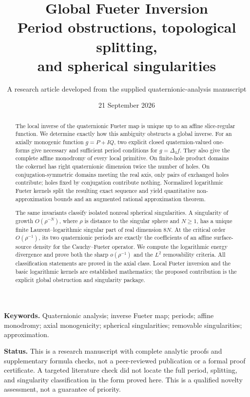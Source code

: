 \documentclass[11pt,a4paper]{article}
\title{\vspace{-10mm}\textbf{Global Fueter Inversion}\\[4pt]
\large Period obstructions, topological splitting,\\and spherical singularities}
\author{A research article developed from the supplied quaternionic-analysis manuscript}
\date{21 September 2026}
\numberwithin{equation}{section}
\theoremstyle{definition}
\theoremstyle{remark}
\begin{document}
\maketitle
\thispagestyle{empty}
\begin{abstract}
The local inverse of the quaternionic Fueter map is unique up to an affine
slice-regular function. We determine exactly how this ambiguity obstructs a
global inverse. For an axially monogenic function $g=P+IQ$, two explicit closed
quaternion-valued one-forms give necessary and sufficient period conditions for
$g=\Delta_4 f$. They also give the complete affine monodromy of every local
primitive. On finite-hole product domains the cokernel has right quaternionic
dimension twice the number of holes. On conjugation-symmetric domains meeting
the real axis, only pairs of exchanged holes contribute; holes fixed by
conjugation contribute nothing. Normalized logarithmic Fueter kernels split the
resulting exact sequence and yield quantitative non-approximation bounds and an
augmented rational approximation theorem.

The same invariants classify isolated nonreal spherical singularities. A
singularity of growth $O(\rho^{-N})$, where $\rho$ is distance to the singular
sphere and $N\geq1$, has a unique finite Laurent--logarithmic singular part of
real dimension $8N$. At the critical order $O(\rho^{-1})$, its two quaternionic
periods are exactly the coefficients of an affine surface-source density for
the Cauchy--Fueter operator. We compute the logarithmic energy divergence and
prove both the sharp $o(\rho^{-1})$ and the $L^2$ removability criteria. All
classification statements are proved in the axial class. Local Fueter inversion
and the basic logarithmic kernels are established mathematics; the proposed
contribution is the explicit global obstruction and singularity package.
\end{abstract}
\medskip
\noindent\textbf{Keywords.} Quaternionic analysis; inverse Fueter map; periods;
affine monodromy; axial monogenicity; spherical singularities; removable
singularities; approximation.

\medskip
\noindent\textbf{Status.} This is a research manuscript with complete analytic
proofs and supplementary formula checks, not a peer-reviewed publication or a
formal proof certificate. A targeted literature check did not locate the full
period, splitting, and singularity classification in the form proved here.
This is a qualified novelty assessment, not a guarantee of priority.
\newpage
\begingroup
\small
\setlength{\parskip}{0pt}
\tableofcontents
\endgroup
\newpage
\end{document}

